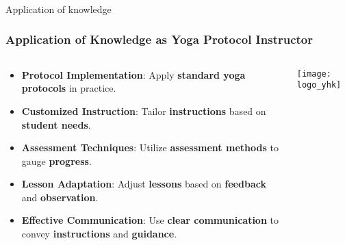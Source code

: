 \begin{frame}[fragile]\frametitle{}
\begin{center}
{\Large Application of knowledge }
\end{center}
\end{frame}


\begin{frame}[fragile]\frametitle{Application of Knowledge as Yoga Protocol Instructor}
\begin{columns}
    \begin{column}[T]{0.5\linewidth}
      \begin{itemize}
        \item \textbf{Protocol Implementation}: Apply \textbf{standard yoga protocols} in practice.
        \item \textbf{Customized Instruction}: Tailor \textbf{instructions} based on \textbf{student needs}.
        \item \textbf{Assessment Techniques}: Utilize \textbf{assessment methods} to gauge \textbf{progress}.
        \item \textbf{Lesson Adaptation}: Adjust \textbf{lessons} based on \textbf{feedback} and \textbf{observation}.
        \item \textbf{Effective Communication}: Use \textbf{clear communication} to convey \textbf{instructions} and \textbf{guidance}.
      \end{itemize}
    \end{column}
    \begin{column}[T]{0.5\linewidth}
        \begin{center}
        \texttt{[image: logo\_yhk]}
        \end{center}	
    \end{column}
\end{columns}
\end{frame}

